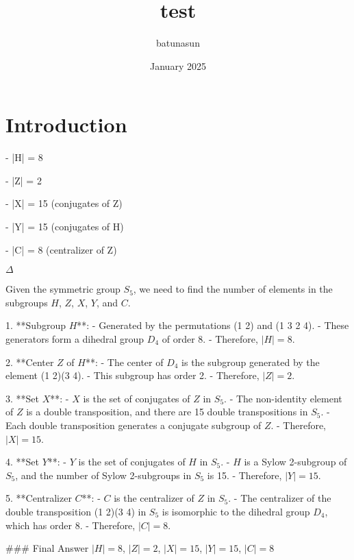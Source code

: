 \documentclass{article}
\title{test}
\author{batunasun }
\date{January 2025}
\begin{document}
\maketitle

\section{Introduction}
- |H| = 8

- |Z| = 2

- |X| = 15 (conjugates of Z)

- |Y| = 15 (conjugates of H)

- |C| = 8 (centralizer of Z)

$\Delta $


Given the symmetric group \( S_5 \), we need to find the number of elements in the subgroups \( H \), \( Z \), \( X \), \( Y \), and \( C \).

1. **Subgroup \( H \)**:
   - Generated by the permutations (1 2) and (1 3 2 4).
   - These generators form a dihedral group \( D_4 \) of order 8.
   - Therefore, \( |H| = 8 \).

2. **Center \( Z \) of \( H \)**:
   - The center of \( D_4 \) is the subgroup generated by the element (1 2)(3 4).
   - This subgroup has order 2.
   - Therefore, \( |Z| = 2 \).

3. **Set \( X \)**:
   - \( X \) is the set of conjugates of \( Z \) in \( S_5 \).
   - The non-identity element of \( Z \) is a double transposition, and there are 15 double transpositions in \( S_5 \).
   - Each double transposition generates a conjugate subgroup of \( Z \).
   - Therefore, \( |X| = 15 \).

4. **Set \( Y \)**:
   - \( Y \) is the set of conjugates of \( H \) in \( S_5 \).
   - \( H \) is a Sylow 2-subgroup of \( S_5 \), and the number of Sylow 2-subgroups in \( S_5 \) is 15.
   - Therefore, \( |Y| = 15 \).

5. **Centralizer \( C \)**:
   - \( C \) is the centralizer of \( Z \) in \( S_5 \).
   - The centralizer of the double transposition (1 2)(3 4) in \( S_5 \) is isomorphic to the dihedral group \( D_4 \), which has order 8.
   - Therefore, \( |C| = 8 \).

### Final Answer
\(|H| = \boxed{8}\), \(|Z| = \boxed{2}\), \(|X| = \boxed{15}\), \(|Y| = \boxed{15}\), \(|C| = \boxed{8}\)
\end{document}
